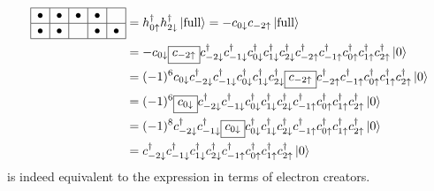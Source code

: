 \begin{align}
\begin{array}{|c|c|c|c|c|}
\hline
\bullet & \bullet & \bullet & \bullet &  \\ \hline
\bullet & \bullet &  & \bullet & \bullet \\
\hline
\end{array}
& = h_{0\uparrow}^\dagger h_{2\downarrow}^\dagger \Ket{\text{full}}
= - c_{0\downarrow} c_{-2\uparrow} \Ket{\text{full}} \nonumber \\
& = - c_{0\downarrow} \boxed{c_{-2\uparrow}}
c_{-2\downarrow}^\dagger c_{-1\downarrow}^\dagger c_{0\downarrow}^\dagger c_{1\downarrow}^\dagger c_{2\downarrow}^\dagger
c_{-2\uparrow}^\dagger c_{-1\uparrow}^\dagger c_{0\uparrow}^\dagger c_{1\uparrow}^\dagger c_{2\uparrow}^\dagger
\Ket{0} \nonumber \\
& = (-1)^6 c_{0\downarrow}
c_{-2\downarrow}^\dagger c_{-1\downarrow}^\dagger c_{0\downarrow}^\dagger c_{1\downarrow}^\dagger c_{2\downarrow}^\dagger
\boxed{c_{-2\uparrow}} c_{-2\uparrow}^\dagger c_{-1\uparrow}^\dagger c_{0\uparrow}^\dagger c_{1\uparrow}^\dagger c_{2\uparrow}^\dagger
\Ket{0} \nonumber \\
& = (-1)^6 \boxed{c_{0\downarrow}}
c_{-2\downarrow}^\dagger c_{-1\downarrow}^\dagger c_{0\downarrow}^\dagger c_{1\downarrow}^\dagger c_{2\downarrow}^\dagger
c_{-1\uparrow}^\dagger c_{0\uparrow}^\dagger c_{1\uparrow}^\dagger c_{2\uparrow}^\dagger
\Ket{0} \nonumber \\
& = (-1)^8
c_{-2\downarrow}^\dagger c_{-1\downarrow}^\dagger \boxed{c_{0\downarrow}} c_{0\downarrow}^\dagger c_{1\downarrow}^\dagger c_{2\downarrow}^\dagger
c_{-1\uparrow}^\dagger c_{0\uparrow}^\dagger c_{1\uparrow}^\dagger c_{2\uparrow}^\dagger
\Ket{0} \nonumber \\
& =
c_{-2\downarrow}^\dagger c_{-1\downarrow}^\dagger c_{1\downarrow}^\dagger c_{2\downarrow}^\dagger
c_{-1\uparrow}^\dagger c_{0\uparrow}^\dagger c_{1\uparrow}^\dagger c_{2\uparrow}^\dagger
\Ket{0}
\end{align}
is indeed equivalent to the expression in terms of electron creators.

